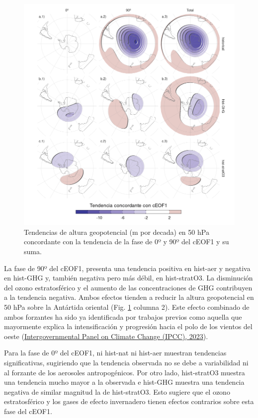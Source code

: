 \documentclass[12pt,oneside,a4paper]{reedthesis}
\begin{document}
\begin{figure}

{\centering \includegraphics{figures/50-cmip6/mapa-trend-1} 

}

\caption{Tendencias de altura geopotencial (m por decada) en 50 hPa concordante con la tendencia de la fase de 0º y 90º del cEOF1 y su suma.}\label{fig:mapa-trend}
\end{figure}



La fase de 90º del cEOF1, presenta una tendencia positiva en hist-aer y negativa en hist-GHG y, también negativa pero más débil, en hist-stratO3.
La disminución del ozono estratosférico y el aumento de las concentraciones de GHG contribuyen a la tendencia negativa.
Ambos efectos tienden a reducir la altura geopotencial en 50 hPa sobre la Antártida oriental (Fig. \ref{fig:mapa-trend} columna 2).
Este efecto combinado de ambos forzantes ha sido ya identificada por trabajos previos como aquella que mayormente explica la intensificación y progresión hacia el polo de los vientos del oeste (\protect\hyperlink{ref-ipcc6ch3}{Intergovernmental Panel on Climate Change (IPCC), 2023}).

Para la fase de 0º del cEOF1, ni hist-nat ni hist-aer muestran tendencias significativas, sugiriendo que la tendencia observada no se debe a variabilidad ni al forzante de los aerosoles antropogénicos.
Por otro lado, hist-stratO3 muestra una tendencia mucho mayor a la observada e hist-GHG muestra una tendencia negativa de similar magnitud la de hist-stratO3.
Esto sugiere que el ozono estratosférico y los gases de efecto invernadero tienen efectos contrarios sobre esta fase del cEOF1.
\end{document}
